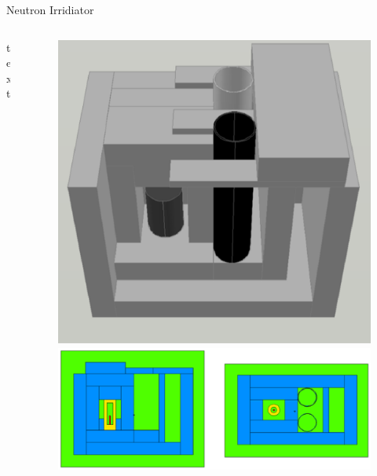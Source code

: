 \begin{frame}{Neutron Irridiator}
\begin{columns}[onlytextwidth]
\begin{column}{0.45\textwidth}
	text
\end{column}
\begin{column}{0.45\textwidth}
	\begin{figure}
		\includegraphics[height=0.25\textheight]{images/NeutronIrridiator_CAD.eps}
		\includegraphics[height=0.25\textheight]{images/NeutronIrridiator_MCNP.eps}
	\end{figure}
\end{column}
\end{columns}
\end{frame}
